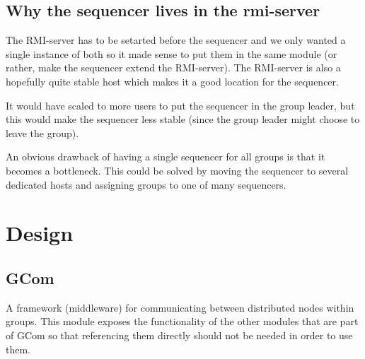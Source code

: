 \documentclass[english]{article}
\begin{document}
\subsection{Why the sequencer lives in the rmi-server}
The RMI-server has to be setarted before the sequencer and we only wanted a single instance of both so it made sense to put them in the same module (or rather, make the sequencer extend the RMI-server). The RMI-server is also a hopefully quite stable host which makes it a good location for the sequencer.

It would have scaled to more users to put the sequencer in the group leader, but this would make the sequencer less stable (since the group leader might choose to leave the group).

An obvious drawback of having a single sequencer for all groups is that it becomes a bottleneck. This could be solved by moving the sequencer to several dedicated hosts and assigning groups to one of many sequencers.



\section{Design}
\subsection{GCom}
A framework (middleware) for communicating between distributed nodes within groups.
This module exposes the functionality of the other modules that are part of GCom so that referencing them directly should not be needed in order to use them.
\end{document}
